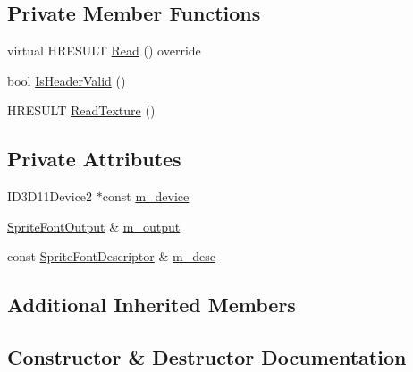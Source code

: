 \subsection*{Private Member Functions}
\begin{DoxyCompactItemize}
\item 
virtual H\+R\+E\+S\+U\+LT \hyperlink{classmage_1_1_sprite_font_reader_a6bc9fa71b4c9d884ba939d99f4c9c0d7}{Read} () override
\item 
bool \hyperlink{classmage_1_1_sprite_font_reader_aa6dd3fc28e531d6db6ecda6ce3535d4c}{Is\+Header\+Valid} ()
\item 
H\+R\+E\+S\+U\+LT \hyperlink{classmage_1_1_sprite_font_reader_a0ab2521309a82f1160e4839b8ca6e400}{Read\+Texture} ()
\end{DoxyCompactItemize}
\subsection*{Private Attributes}
\begin{DoxyCompactItemize}
\item 
I\+D3\+D11\+Device2 $\ast$const \hyperlink{classmage_1_1_sprite_font_reader_aa77ee2a35b9ad15d5c1abfc6ffe5810c}{m\+\_\+device}
\item 
\hyperlink{structmage_1_1_sprite_font_output}{Sprite\+Font\+Output} \& \hyperlink{classmage_1_1_sprite_font_reader_a3df62ce71f85745c493b142c726261b3}{m\+\_\+output}
\item 
const \hyperlink{structmage_1_1_sprite_font_descriptor}{Sprite\+Font\+Descriptor} \& \hyperlink{classmage_1_1_sprite_font_reader_a6951665c0a5fda28ea6784945565cb6e}{m\+\_\+desc}
\end{DoxyCompactItemize}
\subsection*{Additional Inherited Members}


\subsection{Constructor \& Destructor Documentation}
\hypertarget{classmage_1_1_sprite_font_reader_ab257bc3c1f787182c14da56545ff6d10}{}\label{classmage_1_1_sprite_font_reader_ab257bc3c1f787182c14da56545ff6d10} 
